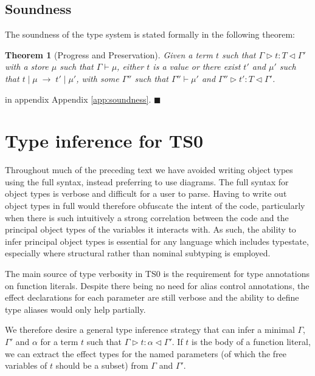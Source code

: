\documentclass[preprint]{sigplanconf}
\newtheorem{thm}{Theorem}
\newcommand{\appref}[1]{Appendix \ref{#1}}
\newcommand{\typerule}[4]{#1 \triangleright #2 : #3 \triangleleft #4}
\newcommand{\oprule}[4]{#1 \mid #2\;\longrightarrow\;#3 \mid #4}
\newcommand{\qed}{$\blacksquare$}
\newenvironment{proof}{\vspace{1ex}\noindent{\bf Proof}\hspace{0.5em}}
  {\hfill\qed\vspace{1ex}}
\begin{document}
\subsection{Soundness}

The soundness of the type system is stated formally in the following
theorem:

\begin{thm}[Progress and Preservation]
Given a term $t$ such that $\typerule{\Gamma}{t}{T}{\Gamma'}$
with a store $\mu$ such that $\Gamma \vdash \mu$, either $t$ is a value or 
there exist $t'$ and $\mu'$ such that
$\oprule{t}{\mu}{t'}{\mu'}$, with some $\Gamma''$ such that
$\Gamma'' \vdash \mu'$ and $\typerule{\Gamma''}{t'}{T}{\Gamma'}$.
\end{thm}

\begin{proof}
in appendix \appref{app:soundness}.
\end{proof}

\section{Type inference for TS0}

Throughout much of the preceding text we have avoided writing object
types using the full syntax, instead preferring to use diagrams. The full
syntax for object types is verbose and difficult for a user to parse.
Having to write out object types in full would therefore obfuscate the
intent of the code, particularly when there is such intuitively a
strong correlation between the code and the principal object types of the
variables it interacts with. As such, the ability to infer principal object
types is essential for any language which includes typestate, especially
where structural rather than nominal subtyping is employed.

The main source of type verbosity in TS0 is the requirement for
type annotations on function literals. 
Despite there being no need for alias control
annotations, the effect declarations for each parameter are still verbose
and the ability to define type aliases would only help partially.

We therefore desire a general type inference strategy that can infer a
minimal $\Gamma$, $\Gamma'$ and $\alpha$ for a term $t$ such that 
$\typerule{\Gamma}{t}{\alpha}{\Gamma'}$. If $t$ is the body of a function
literal, we can extract the effect types for the named parameters (of which
the free variables of $t$ should be a subset) from $\Gamma$ and $\Gamma'$.
\end{document}
